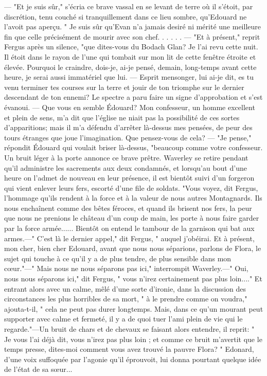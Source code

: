 {— "Et je suis sûr," s'écria ce brave vassal en se levant de terre où il s'étoit, par discrétion, tenu couché si tranquillement dans ce lieu sombre, qu'Edouard ne l'avoit pas aperçu. " Je suis sûr qu'Evan n'a jamais desiré ni mérité une meilleure fin que celle précisément de mourir avec son chef. . . . . .
— "Et à présent," reprit Fergus après un silence, "que dites-vous du Bodach Glan? Je l'ai revu cette nuit. Il étoit dans le rayon\setcounter{page}{387} de l'une qui tombait sur mon lit de cette fenêtre étroite et élevée. Pourquoi le craindre, dois-je, ai-je pensé, demain, long-temps avant cette heure, je serai aussi immatériel que lui. — Esprit mensonger, lui ai-je dit, es tu venu terminer tes courses sur la terre et jouir de ton triomphe sur le dernier descendant de ton ennemi? Le spectre a paru faire un signe d'approbation et s'est évanoui.
— Que vous en semble Édouard? Mon confesseur, un homme excellent et plein de sens, m'a dit que l'église ne niait pas la possibilité de ces sortes d'apparitions; mais il m'a défendu d'arrêter là-dessus mes pensées, de peur des tours étranges que joue l'imagination. Que pensez-vous de cela?
— "Je pense," répondit Édouard qui voulait briser là-dessus, "beaucoup comme votre confesseur. Un bruit léger à la porte annonce ce brave prêtre. Waverley se retire pendant qu'il administre les sacrements aux deux condamnés, et lorsqu'au bout d'une heure on l'admet de nouveau en leur présence, il est bientôt suivi d'un forgeron qui vient enlever leurs fers, escorté d'une file de soldats.
"Vous voyez, dit Fergus, l'hommage qu'ils rendent à la force et à la valeur de nous\setcounter{page}{388} autres Montagnards. Ils nous enchaînent comme des bêtes féroces, et quand ils brisent nos fers, la peur que nous ne prenions le château d'un coup de main, les porte à nous faire garder par la force armée...... Bientôt on entend le tambour de la garnison qui bat aux armes.—" C'est là le dernier appel," dit Fergus, " auquel j'obéirai. Et à présent, mon cher, bien cher Edouard, avant que nous nous séparions, parlons de Flora, le sujet qui touche à ce qu'il y a de plus tendre, de plus sensible dans mon cœur."—" Mais nous ne nous séparons pas ici," interrompit Waverley.—" Oui, nous nous séparons ici," dit Fergus, " vous n'irez certainement pas plus loin...." Et entrant alors avec un calme, mêlé d'une sorte d'ironie, dans la discussion des circonstances les plus horribles de sa mort, " à le prendre comme on voudra," ajouta-t-il, " cela ne peut pas durer longtemps. Mais, dans ce qu'un mourant peut supporter avec calme et fermeté, il y a de quoi tuer l'ami plein de vie qui le regarde."—Un bruit de chars et de chevaux se faisant alors entendre, il reprit: " Je vous l'ai déjà dit, vous n'irez pas plus loin ; et comme ce bruit m'avertit que le temps presse, dites-moi comment vous avez trouvé la pauvre Flora? "\setcounter{page}{389} Edonard, d'une voix suffoquée par l'agonie qu'il éprouvoit, lui donna pourtant quelque idée de l'état de sa sœur...
}
